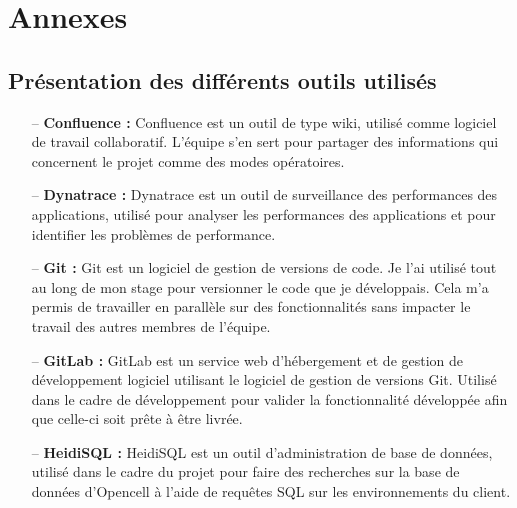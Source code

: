 \documentclass[12pt, a4paper]{report}
\begin{document}
	\begin{flushleft}
		\nocite{*}
		\setlength\bibitemsep{0.5cm}
		\printbibliography{}
	\end{flushleft}

	\appendix
	\chapter*{Annexes}
	\renewcommand{\thesection}{\Alph{section}}

	\section{Présentation des différents outils utilisés}
	\label{sec:outils}

	\begin{itemize}
		\item[–] \textbf{Confluence :} Confluence est un outil de type wiki, utilisé comme logiciel de travail collaboratif. L'équipe s'en sert pour partager des informations qui concernent le projet comme des modes opératoires.
		\vspace{0.5cm}
		\item[–] \textbf{Dynatrace :} Dynatrace est un outil de surveillance des performances des applications, utilisé pour analyser les performances des applications et pour identifier les problèmes de performance.
		\vspace{0.5cm}
		\item[–] \textbf{Git :} Git est un logiciel de gestion de versions de code. Je l'ai utilisé tout au long de mon stage pour versionner le code que je développais. Cela m'a permis de travailler en parallèle sur des fonctionnalités sans impacter le travail des autres membres de l'équipe.
		\vspace{0.5cm}
		\item[–] \textbf{GitLab :} GitLab est un service web d'hébergement et de gestion de développement logiciel utilisant le logiciel de gestion de versions Git. Utilisé dans le cadre de développement pour valider la fonctionnalité développée afin que celle-ci soit prête à être livrée.
		\vspace{0.5cm}
		\item[–] \textbf{HeidiSQL :} HeidiSQL est un outil d'administration de base de données, utilisé dans le cadre du projet pour faire des recherches sur la base de données d'Opencell à l'aide de requêtes SQL sur les environnements du client.
		\vspace{0.5cm}

\end{itemize}
\end{document}
